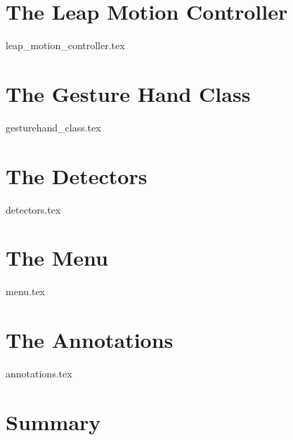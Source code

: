 \section{The Leap Motion Controller}
\label{sec:leap_motion_controller}
{leap_motion_controller.tex}


\section{The Gesture Hand Class}
\label{sec:gesturehand_class}
{gesturehand_class.tex}
 

\section{The Detectors}
\label{sec:detectors}
{detectors.tex}


\section{The Menu}
\label{sec:menu}
{menu.tex}


\section{The Annotations}
\label{sec:annotations}
{annotations.tex}


\section{Summary}
